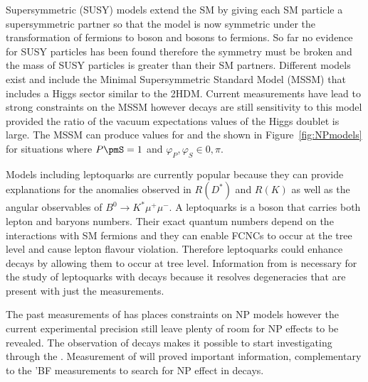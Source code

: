Supersymmetric (SUSY) models extend the SM by giving each SM particle a supersymmetric partner so that the model is now symmetric under the transformation of fermions to boson and bosons to fermions. So far no evidence for SUSY particles has been found therefore the symmetry must be broken and the mass of SUSY particles is greater than their SM partners. Different models exist and include the Minimal Supersymmetric Standard Model (MSSM) that includes a Higgs sector similar to the 2HDM. Current measurements have lead to strong constraints on the MSSM however \bmumu decays are still sensitivity to this model provided the ratio of the vacuum expectations values of the Higgs doublet is large. The MSSM can produce values for \ADG and the \bsmumu \BF shown in Figure~\ref{fig:NPmodels} for situations where $P\pmS =1$ and $\varphi_P, \varphi_S \in {0, \pi}$.

Models including leptoquarks are currently popular because they can provide explanations for the anomalies observed in $R(D^*)$ and $R(K)$ as well as the angular observables of $B^0 \to K^* \mu^+ \mu^-$. A leptoquarks is a boson that carries both lepton and baryons numbers. Their exact quantum numbers depend on the interactions with SM fermions and they can enable FCNCs to occur at the tree level and cause lepton flavour violation. Therefore leptoquarks could enhance \bmumu decays by allowing them to occur at tree level. Information from \ADG is necessary for the study of leptoquarks with \bmumu decays because it resolves degeneracies that are present with just the \BF measurements.

The past measurements of \bmumu \BFs has places constraints on NP models however the current experimental precision still leave plenty of room for NP effects to be revealed. The observation of \bsmumu decays makes it possible to start investigating \ADG through the \bsmumu \el. Measurement of \ADG will proved important information, complementary to the \bmumu 'BF measurements to search for NP effect in \bsmumu decays.
